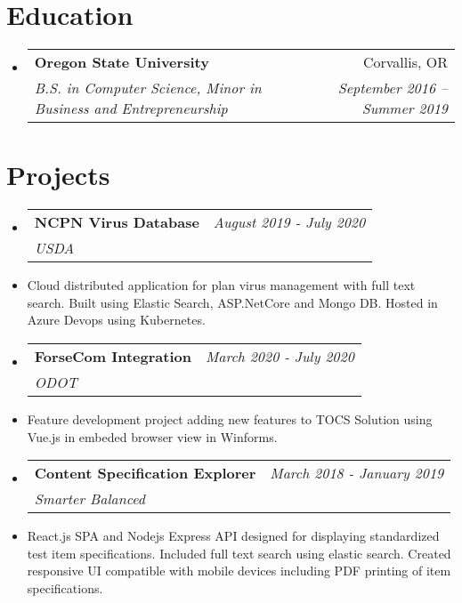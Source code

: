 \documentclass[letterpaper,11pt]{article}
\makeatletter
\newcommand{\resumeSubheading}[4]{
  \vspace{-1pt}\item
    \begin{tabular*}{0.97\textwidth}{l@{\extracolsep{\fill}}r}
      \textbf{\Large#1} & #2 \\
      \textit{\small#3} & \textit{\small #4} \\
    \end{tabular*}\vspace{-5pt}
}
\newcommand{\resumeSubHeadingListStart}{\begin{itemize}[label={},leftmargin=*]}
\newcommand{\resumeSubHeadingListEnd}{\end{itemize}}
\makeatother
\begin{document}
\section{Education}
  \resumeSubHeadingListStart
    \resumeSubheading
      {Oregon State University}{Corvallis, OR}
      {B.S. in Computer Science, Minor in Business and Entrepreneurship}{September 2016 -- Summer 2019}
  \resumeSubHeadingListEnd

\section{Projects}
  \resumeSubHeadingListStart
    \resumeSubheading
    {NCPN Virus Database}{\textit{August 2019 - July 2020 }}
    {USDA}{}
        \item{Cloud distributed application for plan virus management with full text search. Built using Elastic Search, ASP.NetCore and Mongo DB. Hosted in Azure Devops using Kubernetes.}\newline \hfill
        
    \resumeSubheading
    {ForseCom Integration}{ \textit{March 2020 - July 2020}}
    {ODOT}{}
        \item{Feature development project adding new features to TOCS Solution using Vue.js in embeded browser view in Winforms.} \newline \hfill
    \resumeSubheading
        {Content Specification Explorer}{\textit{March 2018 - January 2019}}
    {Smarter Balanced}{}
        \item{React.js SPA and Nodejs Express API designed for displaying standardized test item specifications. Included full text search using elastic search. Created responsive UI compatible with mobile devices including PDF printing of item specifications.} \newline \hfill
        

  \resumeSubHeadingListEnd
\end{document}
